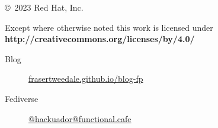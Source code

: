 \documentclass[ignorenonframetext,aspectratio=169,12pt]{beamer}
\begin{document}
\begin{frame}[plain]
\begin{columns}

  \begin{column}{.6\textwidth}

    \setlength{\parskip}{.5em}

    { \centering

    

    \copyright~2023  Red Hat, Inc.

    { \scriptsize
    Except where otherwise noted this work is licensed under
    }
    { \footnotesize
    \textbf{http://creativecommons.org/licenses/by/4.0/}
    }

    }

    \begin{description}
      \item[Blog] \href{https://frasertweedale.github.io/blog-fp/}{frasertweedale.github.io/blog-fp}
      \item[Fediverse] \href{https://functional.cafe/@hackuador}{@hackuador@functional.cafe}
    \end{description}
  \end{column}

\end{columns}
\end{frame}
\end{document}
